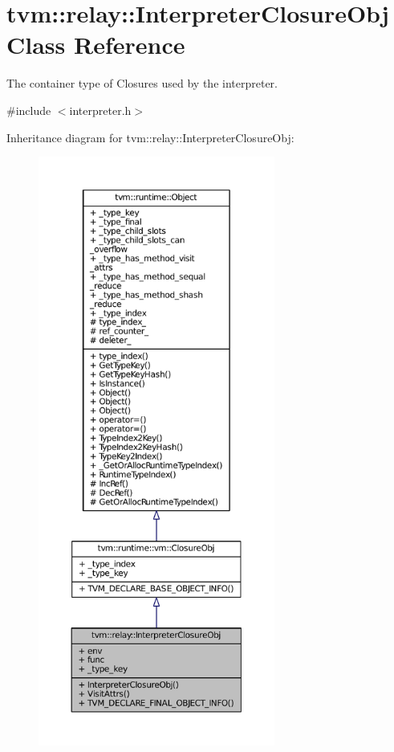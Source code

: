 \hypertarget{classtvm_1_1relay_1_1InterpreterClosureObj}{}\section{tvm\+:\+:relay\+:\+:Interpreter\+Closure\+Obj Class Reference}
\label{classtvm_1_1relay_1_1InterpreterClosureObj}


The container type of Closures used by the interpreter.  




{\ttfamily \#include $<$interpreter.\+h$>$}



Inheritance diagram for tvm\+:\+:relay\+:\+:Interpreter\+Closure\+Obj\+:
\nopagebreak
\begin{figure}[H]
\begin{center}
\leavevmode
\includegraphics[height=550pt]{classtvm_1_1relay_1_1InterpreterClosureObj__inherit__graph}
\end{center}
\end{figure}



